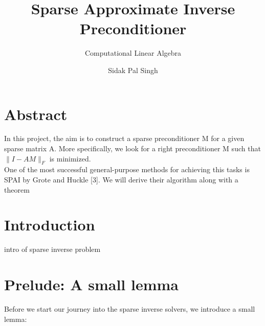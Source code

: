 \documentclass[paper=A4, fontsize=11pt]{scrartcl}
\title{Sparse Approximate Inverse Preconditioner}
\subtitle{Computational Linear Algebra}
\author{Sidak Pal Singh}
\theoremstyle{remark}
\begin{document}
	\maketitle
	
	\section{Abstract}
	
	In this project, the aim is to construct a sparse preconditioner M for a given sparse matrix A. More specifically, we look for a right preconditioner M such that $\|I-A M\|_{F}$ is minimized. \\
	One of the most successful general-purpose methods for achieving this tasks is SPAI by Grote and Huckle [3]. We will derive their algorithm along with a theorem 
	
	
	\section{Introduction}
	
	intro of sparse inverse problem
	
	\newpage
	
	\section{Prelude: A small lemma}
	
	Before we start our journey into the sparse inverse solvers, we introduce a small lemma:
	
\end{document}
